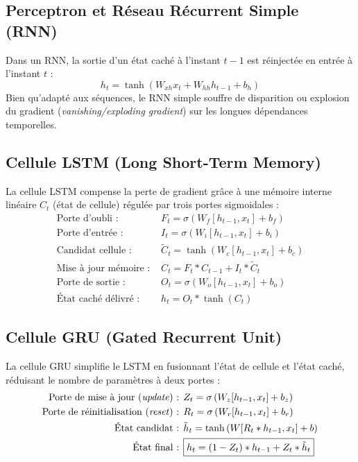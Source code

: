\subsection{Perceptron et Réseau Récurrent Simple (RNN)}

Dans un RNN, la sortie d'un état caché à l'instant $t-1$ est réinjectée en entrée à l'instant $t$ :
\begin{equation}
    h_t = \tanh\left( W_{xh} x_t + W_{hh} h_{t-1} + b_h \right)
\end{equation}
Bien qu'adapté aux séquences, le RNN simple souffre de disparition ou explosion du gradient (\emph{vanishing/exploding gradient}) sur les longues dépendances temporelles.

\subsection{Cellule LSTM (Long Short-Term Memory)}

La cellule LSTM compense la perte de gradient grâce à une mémoire interne linéaire $C_t$ (état de cellule) régulée par trois portes sigmoidales :
\begin{align}
    \text{Porte d'oubli : } & F_t = \sigma\left( W_f [h_{t-1}, x_t] + b_f \right) \\
    \text{Porte d'entrée : } & I_t = \sigma\left( W_i [h_{t-1}, x_t] + b_i \right) \\
    \text{Candidat cellule : } & \tilde{C}_t = \tanh\left( W_c [h_{t-1}, x_t] + b_c \right) \\
    \text{Mise à jour mémoire : } & \boxed{C_t = F_t * C_{t-1} + I_t * \tilde{C}_t} \\
    \text{Porte de sortie : } & O_t = \sigma\left( W_o [h_{t-1}, x_t] + b_o \right) \\
    \text{État caché délivré : } & \boxed{h_t = O_t * \tanh(C_t)}
\end{align}

\subsection{Cellule GRU (Gated Recurrent Unit)}

La cellule GRU simplifie le LSTM en fusionnant l'état de cellule et l'état caché, réduisant le nombre de paramètres à deux portes :
\begin{align}
    \text{Porte de mise à jour (\emph{update}) : } & Z_t = \sigma\left( W_z [h_{t-1}, x_t] + b_z \right) \\
    \text{Porte de réinitialisation (\emph{reset}) : } & R_t = \sigma\left( W_r [h_{t-1}, x_t] + b_r \right) \\
    \text{État candidat : } & \tilde{h}_t = \tanh\left( W [R_t * h_{t-1}, x_t] + b \right) \\
    \text{État final : } & \boxed{h_t = (1 - Z_t) * h_{t-1} + Z_t * \tilde{h}_t}
\end{align}